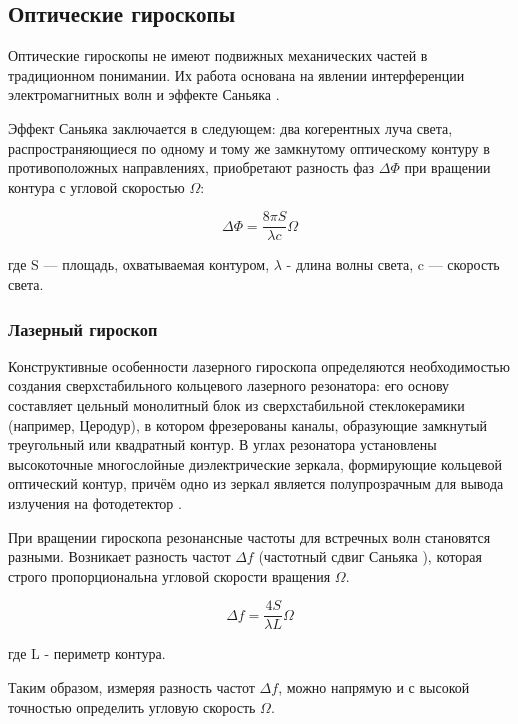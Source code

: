 \subsection{Оптические гироскопы}

Оптические гироскопы не имеют подвижных механических частей в традиционном понимании. Их работа основана на явлении интерференции электромагнитных волн и эффекте Саньяка \cite{malkin_2002}.

Эффект Саньяка заключается в следующем: два когерентных луча света, распространяющиеся по одному и тому же замкнутому оптическому контуру в противоположных направлениях, приобретают разность фаз $\Delta \Phi$ при вращении контура с угловой скоростью $\Omega$:

\begin{equation}
	\Delta \Phi = \frac{8 \pi S}{\lambda c} \Omega
\end{equation}

где S — площадь, охватываемая контуром, $\lambda$ - длина волны света, c — скорость света.


\subsubsection{Лазерный гироскоп}

Конструктивные особенности лазерного гироскопа определяются необходимостью создания сверхстабильного кольцевого лазерного резонатора: его основу составляет цельный монолитный блок из сверхстабильной стеклокерамики (например, Церодур), в котором фрезерованы каналы, образующие замкнутый треугольный или квадратный контур. В углах резонатора установлены высокоточные многослойные диэлектрические зеркала, формирующие кольцевой оптический контур, причём одно из зеркал является полупрозрачным для вывода излучения на фотодетектор \cite{opticheskie_giroskopy_2005}. 

При вращении гироскопа резонансные частоты для встречных волн становятся разными. Возникает разность частот $\Delta f$ (частотный сдвиг Саньяка \cite{malkin_2002}), которая строго пропорциональна угловой скорости вращения $\Omega$. 

\begin{equation}
	\Delta f = \frac{4 S}{\lambda L} \Omega
\end{equation}

где L - периметр контура.

Таким образом, измеряя разность частот $\Delta f$, можно напрямую и с высокой точностью определить угловую скорость $\Omega$.

